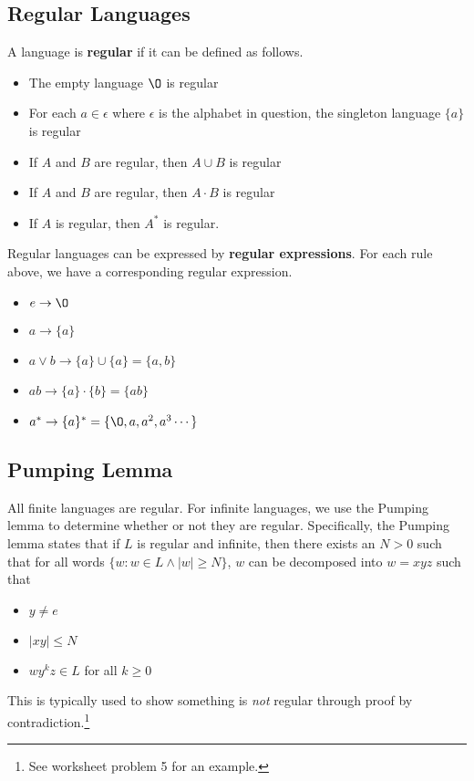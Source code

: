 \documentclass{article}
\begin{document}
		\subsection{Regular Languages} \label{reglangs}
		A language is \textbf{regular} if it can be defined as follows.
		\begin{itemize}
			\item The empty language $\O$ is regular
			\item For each $a \in \epsilon$ where $\epsilon$ is the alphabet in question, the singleton language $\{a\}$ is regular
			\item If $A$ and $B$ are regular, then $A \cup B$ is regular
			\item If $A$ and $B$ are regular, then $A \cdot B$ is regular
			\item If $A$ is regular, then $A^*$ is regular.
		\end{itemize}
		Regular languages can be expressed by \textbf{regular expressions}. For each rule above, we have a corresponding regular expression.
		\begin{itemize}
			\item $e \rightarrow \O$
			\item $a \rightarrow \{a\}$
			\item $a \lor b \rightarrow \{a\} \cup \{a\} = \{a,b\}$
			\item $ab \rightarrow \{a\} \cdot \{b\} = \{ab\}$
			\item $a^* \rightarrow \{a\}^* = \{\O,a,a^2,a^3 \cdots \}$ 
		\end{itemize}
		\subsection{Pumping Lemma}
		All finite languages are regular. For infinite languages, we use the Pumping lemma to determine whether or not they are regular. Specifically, the Pumping lemma states that if $L$ is regular and infinite, then there exists an $N > 0$ such that for all words $\{w : w \in L \land |w| \geq N\}$,  $w$ can be decomposed into $w = xyz$ such that 
		\begin{itemize}
			\item $y \neq e$
			\item $|xy| \leq N$
			\item $wy^kz \in L$ for all $k \geq 0$	
		\end{itemize}		 
		This is typically used to show something is \emph{not} regular through proof by contradiction.\footnote{See worksheet problem 5 for an example.}
\end{document}
